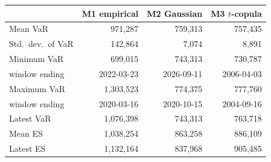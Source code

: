 \begin{tabular}{lrrr}
\toprule
 & M1 empirical & M2 Gaussian & M3 $t$-copula \\
\midrule
Mean VaR & 971,287 & 759,313 & 757,435 \\
Std.\ dev.\ of VaR & 142,864 & 7,074 & 8,891 \\
Minimum VaR & 699,015 & 743,313 & 730,787 \\
\quad window ending & 2022-03-23 & 2026-09-11 & 2006-04-03 \\
Maximum VaR & 1,303,523 & 774,375 & 777,760 \\
\quad window ending & 2020-03-16 & 2020-10-15 & 2004-09-16 \\
Latest VaR & 1,076,398 & 743,313 & 763,718 \\
Mean ES & 1,038,254 & 863,258 & 886,109 \\
Latest ES & 1,132,164 & 837,968 & 905,485 \\
\bottomrule
\end{tabular}
